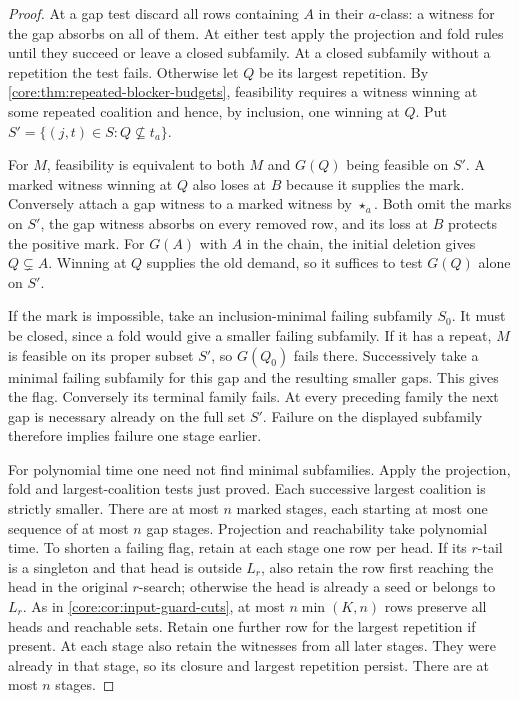 \begin{proof}
At a gap test discard all rows containing $A$ in their $a$-class:
a witness for the gap absorbs on all of them. At either test apply
the projection and fold rules until they succeed or leave a closed
subfamily. At a closed subfamily without a repetition the test fails.
Otherwise let $Q$ be its largest repetition. By
\cref{core:thm:repeated-blocker-budgets}, feasibility requires a
witness winning at some repeated coalition and hence, by inclusion,
one winning at $Q$. Put $S'=\{(j,t)\in S:Q\not\subseteq t_a\}$.

For $M$, feasibility is equivalent to both $M$ and $G(Q)$ being
feasible on $S'$. A marked witness winning at $Q$ also
loses at $B$ because it supplies the mark. Conversely attach a gap
witness to a marked witness by $\star_a$. Both omit the marks on
$S'$, the gap witness absorbs on every removed row, and its loss at
$B$ protects the positive mark. For $G(A)$ with $A$ in the chain,
the initial deletion gives $Q\subsetneq A$. Winning at $Q$ supplies
the old demand, so it suffices to test $G(Q)$ alone on $S'$.

If the mark is impossible, take an inclusion-minimal failing subfamily
$S_0$. It must be closed, since a fold would give a smaller failing
subfamily. If it has a repeat, $M$ is feasible on its proper subset
$S'$, so $G(Q_0)$ fails there. Successively take a minimal failing
subfamily for this gap and the resulting smaller gaps. This gives
the flag. Conversely its terminal family fails. At every preceding
family the next gap is necessary already on the full set $S'$.
Failure on the displayed subfamily therefore implies failure one
stage earlier.

For polynomial time one need not find minimal subfamilies. Apply
the projection, fold and largest-coalition tests just proved. Each
successive largest coalition is strictly smaller. There are at most
$n$ marked stages, each starting at most one sequence of at most $n$
gap stages. Projection and reachability take polynomial time.
To shorten a failing flag, retain at each stage one row per head.
If its $r$-tail is a singleton and that head is outside $L_r$, also
retain the row first reaching the head in the original $r$-search;
otherwise the head is already a seed or belongs to $L_r$.
As in \cref{core:cor:input-guard-cuts}, at most $n\min(K,n)$ rows preserve
all heads and reachable sets. Retain one further row for the largest
repetition if present. At each stage also retain the witnesses from
all later stages. They were already in that stage, so its closure
and largest repetition persist. There are at most $n$ stages.
\end{proof}

